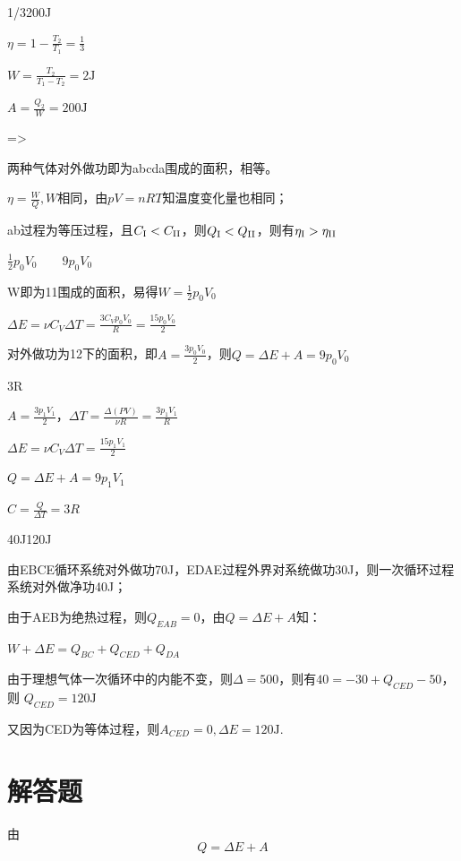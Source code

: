 1/3\qquad200J

\solve
$\eta =1-\frac{T_2}{T_1}=\frac{1}{3}$

$W=\frac{T_2}{T_1-T_2}=2\mathrm{J}$

$A=\frac{Q_2}{W}=200\mathrm{J}$

=\qquad >

\solve 两种气体对外做功即为abcda围成的面积，相等。

$\eta=\frac{W}{Q},W$相同，由$pV=nRT$知温度变化量也相同；

ab过程为等压过程，且$C_{\text{\RNum{1}}}<C_\text{\RNum{2}}$，则$Q_{\text{\RNum{1}}}<Q_{\text{\RNum{2}}}$，则有$\eta_{\text{\RNum{1}}}>\eta_{\text{\RNum{2}}}$

$\frac{1}{2}p_0V_0\qquad 9p_0V_0$

\solve W即为1\to1围成的面积，易得$W=\frac{1}{2}p_0V_0$

$\Delta E=\nu C_V\Delta T=\frac{3C_Vp_0V_0}{R}=\frac{15p_0V_0}{2}$

对外做功为1\to2下的面积，即$A=\frac{3p_0V_0}{2}$，则$Q=\Delta E+A=9p_0V_0$

3R

\solve
$A=\frac{3p_1V_1}{2}$，$\Delta T=\frac{\Delta(PV)}{\nu R}=\frac{3p_1V_1}{R}$

$\Delta E=\nu C_V\Delta T=\frac{15p_1V_1}{2}$

$Q=\Delta E+A=9p_1V_1$

\therefore$C=\frac{Q}{\Delta T}=3R$

40J\qquad 120J

\solve 由EBCE循环系统对外做功70J，EDAE过程外界对系统做功30J，则一次循环过程系统对外做净功40J；

由于AEB为绝热过程，则$Q_{EAB}=0$，由$Q=\Delta E+A$知：

$W+\Delta E=Q_{BC}+Q_{CED}+Q_{DA}$

由于理想气体一次循环中的内能不变，则$\Delta=500$，则有$40=-30+Q_{CED}-50$，则
$Q_{CED}=120\mathrm{J}$

又因为CED为等体过程，则$A_{CED}=0,\Delta E=120\mathrm{J}$.

\section{解答题}


\solve 由\[Q = \Delta E + A\]

